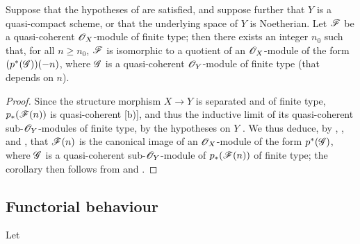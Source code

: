 \begin{corollary}[3.4.8]
\label{II.3.4.8}
Suppose that the hypotheses of  are satisfied, and suppose further that $Y$ is a quasi-compact scheme, or that the underlying space of $Y$ is Noetherian.
Let $\mathscr{F}$ be a quasi-coherent $\mathscr{O}_X$-module of finite type;
then there exists an integer $n_0$ such that, for all $n\geq n_0$, $\mathscr{F}$ is isomorphic to a quotient of an $\mathscr{O}_X$-module of the form $(p^*(\mathscr{G}))(-n)$, where $\mathscr{G}$ is a quasi-coherent $\mathscr{O}_Y$-module of finite type (that depends on $n$).
\end{corollary}

\begin{proof}
Since the structure morphism $X\to Y$ is separated and of finite type, $p_*(\mathscr{F}(n))$ is quasi-coherent [b)], and thus the inductive limit of its quasi-coherent sub-$\mathscr{O}_Y$-modules of finite type, by the hypotheses on $Y$ .
We thus deduce, by , , and , that $\mathscr{F}(n)$ is the canonical image of an $\mathscr{O}_X$-module of the form $p^*(\mathscr{G})$, where $\mathscr{G}$ is a quasi-coherent sub-$\mathscr{O}_Y$-module of $p_*(\mathscr{F}(n))$ of finite type;
the corollary then follows from  and .
\end{proof}


\subsection{Functorial behaviour}
\label{subsection:II.3.5}

\begin{env}[3.5.1]
\label{II.3.5.1}
Let
\end{env}






